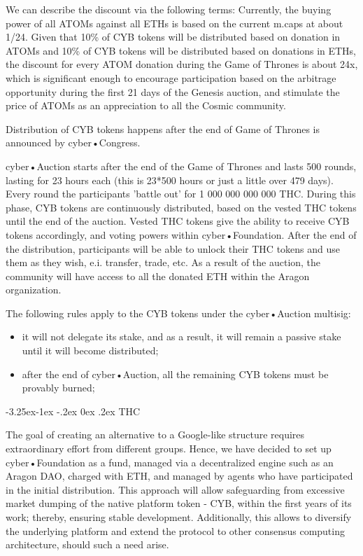 \documentclass[8pt,oneside]{amsart}
\makeatletter
\renewcommand\subsection{\@startsection{subsection}{2}{\z@}%
                                     {-3.25ex\@plus -1ex \@minus -.2ex}%
                                     {0ex \@plus .2ex}%
                                     {\play\Large}}%
\newcommand{\titleSection}[1]{\subsection{#1}}
\makeatother
\begin{document}
\begin{Abstract}
We can describe the discount via the following terms: Currently, the buying power of all ATOMs against all ETHs is based on the current m.caps at about 1/24. Given that 10\% of CYB tokens will be distributed based on donation in ATOMs and 10\% of CYB tokens will be distributed based on donations in ETHs, the discount for every ATOM donation during the Game of Thrones is about 24x, which is significant enough to encourage participation based on the arbitrage opportunity during the first 21 days of the Genesis auction, and stimulate the price of ATOMs as an appreciation to all the Cosmic community.

Distribution of CYB tokens happens after the end of Game of Thrones is announced by cyber•Congress.

cyber•Auction starts after the end of the Game of Thrones and lasts 500 rounds, lasting for 23 hours each (this is 23*500 hours or just a little over 479 days). Every round the participants 'battle out' for 1 000 000 000 000 THC. During this phase, CYB tokens are continuously distributed, based on the vested THC tokens until the end of the auction. Vested THC tokens give the ability to receive CYB tokens accordingly, and voting powers within cyber•Foundation. After the end of the distribution, participants will be able to unlock their THC tokens and use them as they wish, e.i. transfer, trade, etc. As a result of the auction, the community will have access to all the donated ETH within the Aragon organization.

The following rules apply to the CYB tokens under the cyber•Auction multisig:

\begin{itemize}
\item it will not delegate its stake, and as a result, it will remain a passive stake until it will become distributed;
\item after the end of cyber•Auction, all the remaining CYB tokens must be provably burned;
\end{itemize}

\titleSection{THC}\label{THC}

The goal of creating an alternative to a Google-like structure requires extraordinary effort from different groups. Hence, we have decided to set up cyber•Foundation as a fund, managed via a decentralized engine such as an Aragon DAO, charged with ETH, and managed by agents who have participated in the initial distribution. This approach will allow safeguarding from excessive market dumping of the native platform token - CYB, within the first years of its work; thereby, ensuring stable development. Additionally, this allows to diversify the underlying platform and extend the protocol to other consensus computing architecture, should such a need arise.


\end{Abstract}
\end{document}
